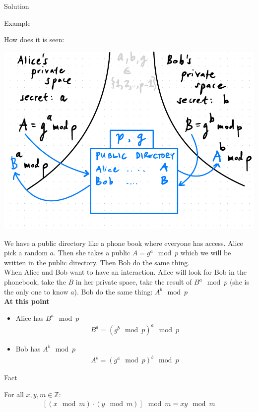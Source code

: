 \begin{parag}{Solution}
\begin{subparag}{Example}
    \end{subparag}
How does it is seen:
\begin{center}
    \includegraphics[scale=0.4]{12025-03-19.png}
\end{center}
We have a public directory like a phone book where everyone has access. Alice pick a random $a$. Then she takes a public $A = g^a \mod p$ which we will be written in the public directory. Then Bob do the same thing.  \\
When Alice and Bob want to have an interaction. Alice will look for Bob in the phonebook, take the $B$ in her private space, take the result of $B^a \mod p$ (she is the only one to know $a$). Bob do the same thing: $A^b \mod p$\\
\textbf{At this point} 
\begin{itemize}
    \item Alice has  $B^a \mod p$
        \begin{align*}
            B^a = (g^b \mod p)^a \mod p
        \end{align*}
    \item Bob has $A^b \mod p$
        \begin{align*}
            A^b = (g^a \mod p)^b \mod p
        \end{align*}
        
        
       
\end{itemize}
\begin{subparag}{Fact}
    \begin{theoreme}
        For all $x, y, m \in \mathbb{Z}$:
        \begin{align*}
            \left[ (x \mod m) \cdot (y \mod m) \right] \mod m = xy \mod m
        \end{align*}
        

\end{theoreme}
\end{subparag}
\end{parag}
